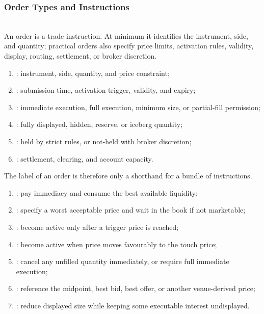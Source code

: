 \subsubsection{Order Types and Instructions}

\begin{definition} \\
An order is a trade instruction. At minimum it identifies the instrument, side, and quantity; practical orders also specify price limits, activation rules, validity, display, routing, settlement, or broker discretion.
\end{definition}

\begin{taxonomy} 
\begin{enumerate}[label=\roman*.]
\setlength{\itemsep}{0pt}
\item {}: instrument, side, quantity, and price constraint;
\item {}: submission time, activation trigger, validity, and expiry;
\item {}: immediate execution, full execution, minimum size, or partial-fill permission;
\item {}: fully displayed, hidden, reserve, or iceberg quantity;
\item {}: held by strict rules, or not-held with broker discretion;
\item {}: settlement, clearing, and account capacity.
\end{enumerate}
The label of an order is therefore only a shorthand for a bundle of instructions.
\end{taxonomy}

\begin{taxonomy} 
\begin{enumerate}[label=\roman*.]
\setlength{\itemsep}{0pt}
\item {}: pay immediacy and consume the best available liquidity;
\item {}: specify a worst acceptable price and wait in the book if not marketable;
\item {}: become active only after a trigger price is reached;
\item {}: become active when price moves favourably to the touch price;
\item {}: cancel any unfilled quantity immediately, or require full immediate execution;
\item {}: reference the midpoint, best bid, best offer, or another venue-derived price;
\item {}: reduce displayed size while keeping some executable interest undisplayed.
\end{enumerate}
\end{taxonomy}

